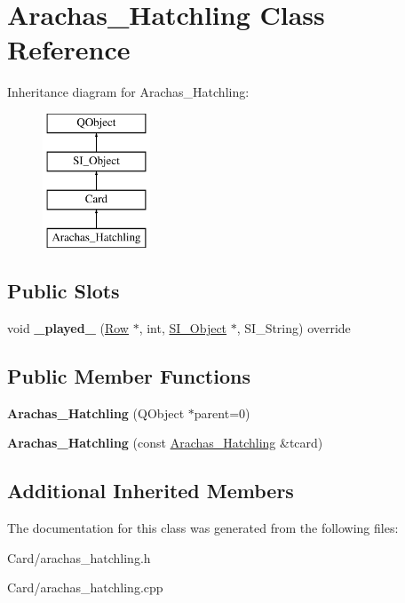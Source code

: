 \hypertarget{class_arachas___hatchling}{}\section{Arachas\+\_\+\+Hatchling Class Reference}
\label{class_arachas___hatchling}
Inheritance diagram for Arachas\+\_\+\+Hatchling\+:\begin{figure}[H]
\begin{center}
\leavevmode
\includegraphics[height=4.000000cm]{class_arachas___hatchling}
\end{center}
\end{figure}
\subsection*{Public Slots}
\begin{DoxyCompactItemize}
\item 
\mbox{\label{class_arachas___hatchling_a8b41bbb01db64e873c3fd32959bebc25}} 
void {\bfseries \+\_\+played\+\_\+} (\hyperlink{class_card_set}{Row} $\ast$, int, \hyperlink{class_s_i___object}{S\+I\+\_\+\+Object} $\ast$, S\+I\+\_\+\+String) override
\end{DoxyCompactItemize}
\subsection*{Public Member Functions}
\begin{DoxyCompactItemize}
\item 
\mbox{\label{class_arachas___hatchling_a56909f74ed54811bb2c749e6391f1440}} 
{\bfseries Arachas\+\_\+\+Hatchling} (Q\+Object $\ast$parent=0)
\item 
\mbox{\label{class_arachas___hatchling_a98837879ef78322d15c7b9f69ef063b2}} 
{\bfseries Arachas\+\_\+\+Hatchling} (const \hyperlink{class_arachas___hatchling}{Arachas\+\_\+\+Hatchling} \&tcard)
\end{DoxyCompactItemize}
\subsection*{Additional Inherited Members}


The documentation for this class was generated from the following files\+:\begin{DoxyCompactItemize}
\item 
Card/arachas\+\_\+hatchling.\+h\item 
Card/arachas\+\_\+hatchling.\+cpp\end{DoxyCompactItemize}
